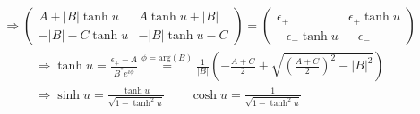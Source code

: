\documentclass{article}
\begin{document}
\begin{gather}
	\Rightarrow \begin{pmatrix}
		A + |B| \tanh u & A \tanh u + |B| \\
		-|B| - C \tanh u & -|B| \tanh u - C
	\end{pmatrix} = \begin{pmatrix}
		\epsilon_+ & \epsilon_+ \tanh u \\
		-\epsilon_- \tanh u & -\epsilon_-
	\end{pmatrix}
\end{gather}
\begin{gather}
	\Rightarrow \tanh u = \frac{\epsilon_+ - A}{B^* e^{i\phi}} \overset{\phi = \mathrm{arg}(B)}{=} \frac{1}{|B|} \left( -\frac{A + C}{2} + \sqrt{\left(\frac{A+C}{2}\right)^2 - |B|^2} \right) \\
%
	\Rightarrow \sinh u = \frac{\tanh u}{\sqrt{1 - \tanh^2 u}} \qquad \cosh u = \frac{1}{\sqrt{1 - \tanh^2 u}}
\end{gather}
\end{document}
